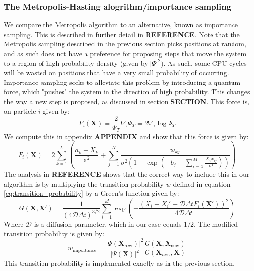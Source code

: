 \documentclass[a4paper, 10pt]{article}
\begin{document}
	\subsubsection{The Metropolis-Hasting alogrithm/importance sampling}
	We compare the Metropolis algorithm to an alternative, known as importance sampling. This is described in further detail in \textbf{REFERENCE}. Note that the Metropolis sampling described in the previous section picks positions at random, and as such does not have a preference for proposing steps that move the system to a region of high probability density (given by $|\Psi|^2$). As such, some CPU cycles will be wasted on positions that have a very small probability of occurring. Importance sampling seeks to alleviate this problem by introducing a quantum force, which "pushes" the system in the direction of high probability. This changes the way a new step is proposed, as discussed in section \textbf{SECTION}. This force is, on particle $i$ given by:
	\begin{equation}
	F_i(\boldsymbol{X})=\frac{2}{\Psi_T}\nabla_i \Psi_T=2\nabla_i \log \Psi_T
	\end{equation}
	We compute this in appendix \textbf{APPENDIX} and show that this force is given by:
	\begin{equation}\label{eq:quantum_force}
	F_i(\boldsymbol{X})=2\sum_{k=1}^D \left(\frac{a_k-X_k}{\sigma^2}+\sum_{j=1}^N \frac{w_{kj}}{\sigma^2 \left(1+ \exp \left(-b_j-\sum_{i=1}^{M} \frac{X_iw_{ij}}{\sigma^2}\right)\right)}\right)
	\end{equation}
	The analysis in \textbf{REFERENCE} shows that the correct way to include this in our algorithm is by multiplying the transition probability $w$ defined in equation \ref{eq:transition_probability} by a Green's function given by:
	\begin{equation}
	G(\mathbf{X}, \mathbf{X}')=\frac{1}{(4\mathcal{D}\Delta t)^{3/2}}\sum_{i=1}^M \exp \left(-\frac{(X_i-X_i'-\mathcal{D}\Delta t F_i(\mathbf{X}'))^2}{4\mathcal{D}\Delta t}\right)
	\end{equation}
	Where $\mathcal{D}$ is a diffusion parameter, which in our case equals $1/2$. The modified transition probability is given by:
	\begin{equation}
	w_{\mathrm{importance}}=\frac{|\Psi(\boldsymbol{X}_{\mathrm{new}})|^2}{|\Psi(\boldsymbol{X})|^2}\frac{G(\boldsymbol{X}, \boldsymbol{X}_{\mathrm{new}})}{G(\boldsymbol{X}_{new}, \boldsymbol{X})}
	\end{equation}
	This transition probability is implemented exactly as in the previous section. 
\end{document}
